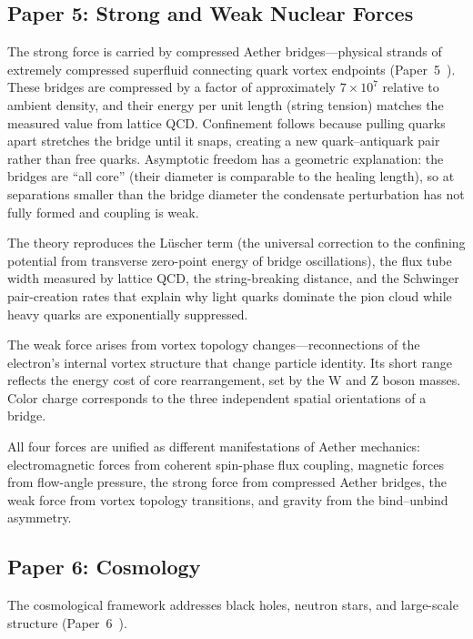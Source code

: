 \documentclass[12pt,letterpaper]{article}
\begin{document}
\subsection{Paper 5: Strong and Weak Nuclear Forces}

The strong force is carried by compressed Aether bridges---physical strands of
extremely compressed superfluid connecting quark vortex endpoints
(Paper~5~\cite{otto-nuclear}).  These bridges are compressed by a factor of
approximately $7 \times 10^7$ relative to ambient density, and their energy
per unit length (string tension) matches the measured value from lattice QCD.
Confinement follows because pulling quarks apart stretches the bridge until it
snaps, creating a new quark--antiquark pair rather than free quarks.  Asymptotic
freedom has a geometric explanation: the bridges are ``all core'' (their diameter
is comparable to the healing length), so at separations smaller than the bridge
diameter the condensate perturbation has not fully formed and coupling is weak.

The theory reproduces the Lüscher term (the universal correction to the confining
potential from transverse zero-point energy of bridge oscillations), the flux tube
width measured by lattice QCD, the string-breaking distance, and the Schwinger
pair-creation rates that explain why light quarks dominate the pion cloud while heavy
quarks are exponentially suppressed.

The weak force arises from vortex topology changes---reconnections of the electron's
internal vortex structure that change particle identity.  Its short range reflects the
energy cost of core rearrangement, set by the W and Z boson masses.  Color charge
corresponds to the three independent spatial orientations of a bridge.

All four forces are unified as different manifestations of Aether mechanics:
electromagnetic forces from coherent spin-phase flux coupling, magnetic forces
from flow-angle pressure, the strong force from compressed Aether bridges, the weak
force from vortex topology transitions, and gravity from the bind--unbind asymmetry.


\subsection{Paper 6: Cosmology}

The cosmological framework addresses black holes, neutron stars, and large-scale
structure (Paper~6~\cite{otto-cosmology}).
\end{document}
